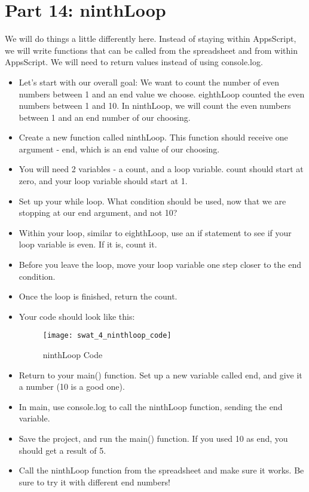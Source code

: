 \documentclass{article}
\begin{document}
\section*{Part 14: ninthLoop}
We will do things a little differently here.  Instead of staying within AppsScript, we will write functions that can be called from the spreadsheet and from within AppsScript.  We will need to return values instead of using console.log.  
\begin{itemize}
	\item Let's start with our overall goal:  We want to count the number of even numbers between 1 and an end value we choose.  eighthLoop counted the even numbers between 1 and 10. In ninthLoop, we will count the even numbers between 1 and an end number of our choosing.
	\item Create a new function called ninthLoop.  This function should receive one argument - end, which is an end value of our choosing.
	\item You will need 2 variables - a count, and a loop variable.  count should start at zero, and your loop variable should start at 1.
	\item Set up your while loop.  What condition should be used, now that we are stopping at our end argument, and not 10?
	\item Within your loop, similar to eighthLoop, use an if statement to see if your loop variable is even.  If it is, count it.
	\item Before you leave the loop, move your loop variable one step closer to the end condition.
	\item Once the loop is finished, return the count.
	\item Your code should look like this:
	\begin{figure}[H]
  		\centering
  		\texttt{[image: swat\_4\_ninthloop\_code]}
  		\caption{ninthLoop Code}
	\end{figure}
	\item Return to your main() function.  Set up a new variable called end, and give it a number (10 is a good one).
	\item In main, use console.log to call the ninthLoop function, sending the end variable.
	\item Save the project, and run the main() function.  If you used 10 as end, you should get a result of 5.
	\item Call the ninthLoop function from the spreadsheet and make sure it works.  Be sure to try it with different end numbers!
\end{itemize}
\end{document}
